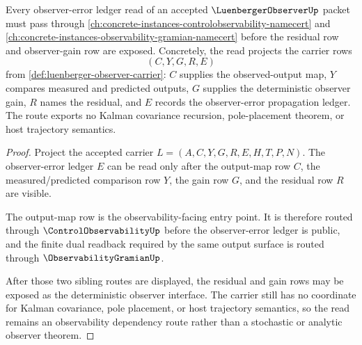 \begin{theorem}
\label{thm:luenberger-observer-observability-dependency-route}
Every observer-error ledger read of an accepted $\LuenbergerObserverUp$ packet must pass through \autoref{ch:concrete-instances-controlobservability-namecert} and \autoref{ch:concrete-instances-observability-gramian-namecert} before the residual row and observer-gain row are exposed. Concretely, the read projects the carrier rows
$$
(C,Y,G,R,E)
$$
from \autoref{def:luenberger-observer-carrier}: $C$ supplies the observed-output map, $Y$ compares measured and predicted outputs, $G$ supplies the deterministic observer gain, $R$ names the residual, and $E$ records the observer-error propagation ledger. The route exports no Kalman covariance recursion, pole-placement theorem, or host trajectory semantics.
\end{theorem}
\begin{proof}
Project the accepted carrier $L=(A,C,Y,G,R,E,H,T,P,N)$. The observer-error ledger $E$ can be read only after the output-map row $C$, the measured/predicted comparison row $Y$, the gain row $G$, and the residual row $R$ are visible.

The output-map row is the observability-facing entry point. It is therefore routed through $\ControlObservabilityUp$ before the observer-error ledger is public, and the finite dual readback required by the same output surface is routed through $\ObservabilityGramianUp$.

After those two sibling routes are displayed, the residual and gain rows may be exposed as the deterministic observer interface. The carrier still has no coordinate for Kalman covariance, pole placement, or host trajectory semantics, so the read remains an observability dependency route rather than a stochastic or analytic observer theorem.
\end{proof}
